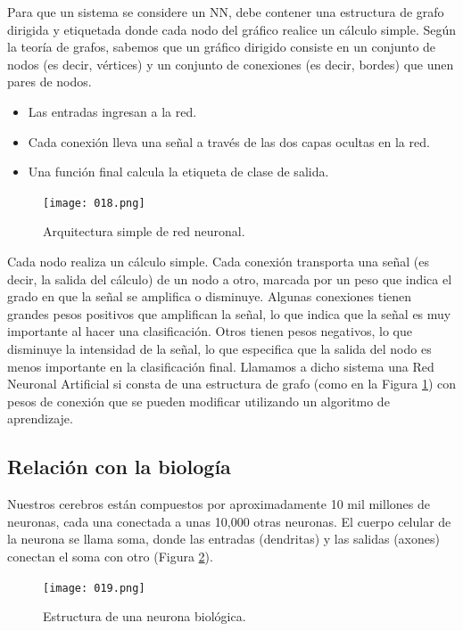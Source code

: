 \documentclass[14.5pt,a4paper]{article}
\begin{document}
Para que un sistema se considere un NN, debe contener una estructura de grafo dirigida y etiquetada donde cada nodo del gráfico realice un cálculo simple. Según la teoría de grafos, sabemos que un gráfico dirigido consiste en un conjunto de nodos (es decir, vértices) y un conjunto de conexiones (es decir, bordes) que unen pares de nodos.

\begin{itemize}
\item Las entradas ingresan a la red. 
\item Cada conexión lleva una señal a través de las dos capas ocultas en la red. 
\item Una función final calcula la etiqueta de clase de salida.
\end{itemize}

\begin{figure}[H]
	\begin{center}				
	\texttt{[image: 018.png]}
  	\caption{Arquitectura simple de red neuronal.}
  	\label{fig:nn}
  	\end{center}
\end{figure}

Cada nodo realiza un cálculo simple. Cada conexión transporta una señal (es decir, la salida del cálculo) de un nodo a otro, marcada por un peso que indica el grado en que la señal se amplifica o disminuye. Algunas conexiones tienen grandes pesos positivos que amplifican la señal, lo que indica que la señal es muy importante al hacer una clasificación. Otros tienen pesos negativos, lo que disminuye la intensidad de la señal, lo que especifica que la salida del nodo es menos importante en la clasificación final. Llamamos a dicho sistema una Red Neuronal Artificial si consta de una estructura de grafo (como en la Figura \ref{fig:nn}) con pesos de conexión que se pueden modificar utilizando un algoritmo de aprendizaje.

\subsection{Relación con la biología}
Nuestros cerebros están compuestos por aproximadamente 10 mil millones de neuronas, cada una conectada a unas 10,000 otras neuronas. El cuerpo celular de la neurona se llama soma, donde las entradas (dendritas) y las salidas (axones) conectan el soma con otro (Figura \ref{fig:realneuron}).

\begin{figure}[H]
	\begin{center}				
	\texttt{[image: 019.png]}
  	\caption{Estructura de una neurona biológica.}
  	\label{fig:realneuron}
  	\end{center}
\end{figure}
\end{document}
